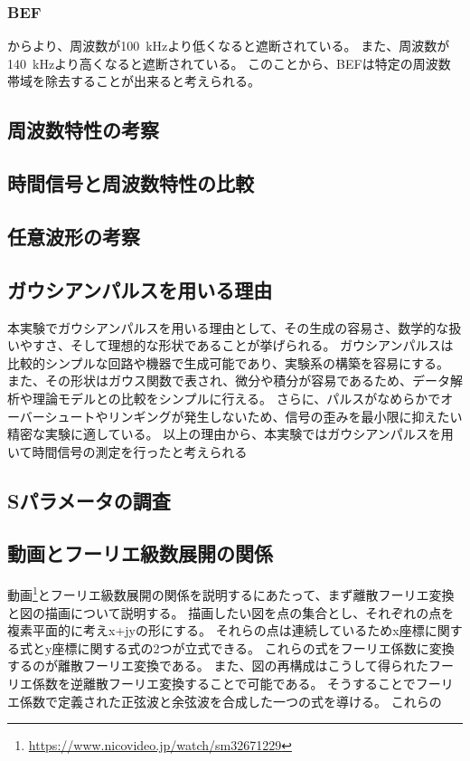 \documentclass[11pt,dvipdfmx]{jarticle}
\begin{document}
\subsubsection{BEF}
からより、周波数が100\ kHzより低くなると遮断されている。
また、周波数が140\ kHzより高くなると遮断されている。
このことから、BEFは特定の周波数帯域を除去することが出来ると考えられる。
\subsection{周波数特性の考察}

\subsection{時間信号と周波数特性の比較}

\subsection{任意波形の考察}

\subsection{ガウシアンパルスを用いる理由}
本実験でガウシアンパルスを用いる理由として、その生成の容易さ、数学的な扱いやすさ、そして理想的な形状であることが挙げられる。
ガウシアンパルスは比較的シンプルな回路や機器で生成可能であり、実験系の構築を容易にする。
また、その形状はガウス関数で表され、微分や積分が容易であるため、データ解析や理論モデルとの比較をシンプルに行える。
さらに、パルスがなめらかでオーバーシュートやリンギングが発生しないため、信号の歪みを最小限に抑えたい精密な実験に適している。
以上の理由から、本実験ではガウシアンパルスを用いて時間信号の測定を行ったと考えられる
\subsection{Sパラメータの調査}

\subsection{動画とフーリエ級数展開の関係}
動画\footnote{\url{https://www.nicovideo.jp/watch/sm32671229}}とフーリエ級数展開の関係を説明するにあたって、まず離散フーリエ変換と図の描画について説明する。
描画したい図を点の集合とし、それぞれの点を複素平面的に考えx+jyの形にする。
それらの点は連続しているためx座標に関する式とy座標に関する式の2つが立式できる。
これらの式をフーリエ係数に変換するのが離散フーリエ変換である。
また、図の再構成はこうして得られたフーリエ係数を逆離散フーリエ変換することで可能である。
そうすることでフーリエ係数で定義された正弦波と余弦波を合成した一つの式を導ける。
これらの
\end{document}
